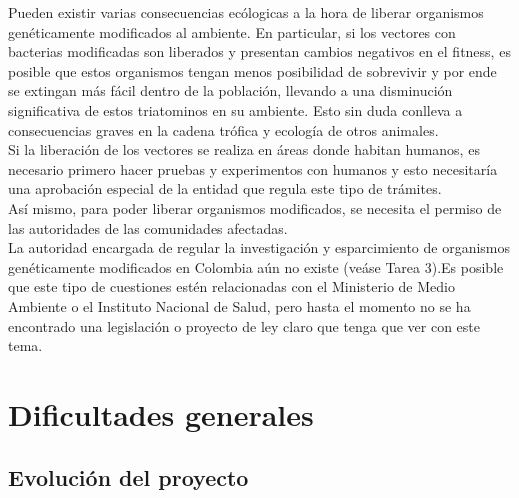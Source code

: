 \documentclass[12pt]{article}
\numberwithin{equation}{section}
\begin{document}
Pueden existir varias consecuencias ecólogicas a la hora de liberar organismos genéticamente modificados al ambiente. En particular, si los vectores con bacterias modificadas son liberados y presentan cambios negativos en el fitness, es posible que estos organismos tengan menos posibilidad de sobrevivir y por ende se extingan más fácil dentro de la población, llevando a una disminución significativa de estos triatominos en su ambiente. Esto sin duda conlleva a consecuencias graves en la cadena trófica y ecología de otros animales.\\
Si la liberación de los vectores se realiza en áreas donde habitan humanos, es necesario primero hacer pruebas y experimentos con humanos y esto necesitaría una aprobación especial de la entidad que regula este tipo de trámites.\\
Así mismo, para poder liberar organismos modificados, se necesita el permiso de las autoridades de las comunidades afectadas.\\
La autoridad encargada de regular la investigación y esparcimiento de organismos genéticamente modificados en Colombia aún no existe (veáse Tarea 3).Es posible que este tipo de cuestiones estén relacionadas con el Ministerio de Medio Ambiente o el Instituto Nacional de Salud, pero hasta el momento no se ha encontrado una legislación o proyecto de ley claro que tenga que ver con este tema.


\section{Dificultades generales}

\subsection{Evolución del proyecto}
\end{document}
